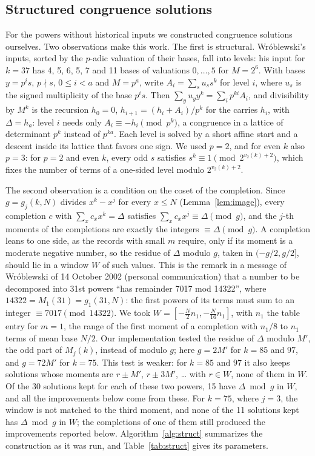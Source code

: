 \documentclass[11pt]{amsart}
\theoremstyle{definition}
\theoremstyle{remark}
\begin{document}
\subsection{Structured congruence solutions}\label{sec:structured}
For the powers without historical inputs we constructed congruence solutions ourselves. Two
observations make this work. The first is structural. Wr\'oblewski's inputs, sorted by the
$p$-adic valuation of their bases, fall into levels: his input for $k=37$ has 4, 5, 6, 5, 7 and 11
bases of valuations $0,\dots,5$ for $M=2^6$. With bases $y=p^is$, $p\nmid s$, $0\le i<a$ and
$M=p^a$, write $A_i=\sum_s u_s s^k$ for level $i$, where $u_s$ is the signed multiplicity of the
base $p^is$. Then $\sum_y u_yy^k=\sum_ip^{ki}A_i$, and divisibility by $M^k$ is the recursion
$h_0=0$, $h_{i+1}=(h_i+A_i)/p^k$ for the carries $h_i$, with $\Delta=h_a$: level $i$ needs only
$A_i\equiv-h_i\pmod{p^k}$, a congruence in a lattice of determinant $p^k$ instead of $p^{ka}$.
Each level is solved by a short affine start and a descent inside its lattice that favors one
sign. We used $p=2$, and for even $k$ also $p=3$: for $p=2$ and even $k$, every odd $s$ satisfies
$s^k\equiv1\pmod{2^{v_2(k)+2}}$, which fixes the number of terms of a one-sided level modulo
$2^{v_2(k)+2}$.

The second observation is a condition on the coset of the completion. Since $g=g_j(k,N)$
divides $x^k-x^j$ for every $x\le N$ (Lemma~\ref{lem:image}), every completion $c$ with
$\sum_xc_xx^k=\Delta$ satisfies $\sum_xc_xx^j\equiv\Delta\pmod g$, and the $j$-th moments of the
completions are exactly the integers $\equiv\Delta\pmod g$. A completion leans to one side, as
the records with small $m$ require, only if its moment is a moderate negative number, so the
residue of $\Delta$ modulo $g$, taken in $(-g/2,g/2]$, should lie in a window $W$ of such values.
This is the remark in a message of Wr\'oblewski of 14 October 2002 (personal communication) that
a number to be decomposed into 31st powers ``has remainder 7017 mod 14322'', where
$14322=M_1(31)=g_1(31,N)$: the first powers of its terms must sum to an integer
$\equiv7017\pmod{14322}$. We took $W=[-\tfrac N2n_1,-\tfrac N{16}n_1]$, with $n_1$ the table entry
for $m=1$, the range of the first moment of a completion with $n_1/8$ to $n_1$ terms of mean
base $N/2$. Our implementation tested the residue of $\Delta$ modulo $M'$, the odd part of
$M_j(k)$, instead of modulo $g$; here $g=2M'$ for $k=85$ and $97$, and $g=72M'$ for $k=75$. This
test is weaker: for $k=85$ and $97$ it also keeps solutions whose moments are $r\pm M'$,
$r\pm3M'$, \dots{} with $r\in W$, none of them in $W$. Of the 30 solutions kept for each of these
two powers, 15 have $\Delta\bmod g$ in $W$, and all the improvements below come from these. For
$k=75$, where $j=3$, the window is not matched to the third moment, and none of the 11 solutions
kept has $\Delta\bmod g$ in $W$; the completions of one of them still produced the improvements
reported below. Algorithm~\ref{alg:struct} summarizes the construction as it was run, and
Table~\ref{tab:struct} gives its parameters.
\end{document}
